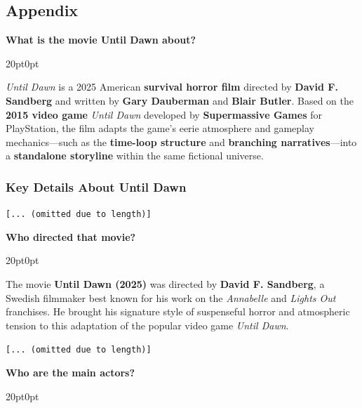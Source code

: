\documentclass[fleqn,moreauthors,10pt]{ds_report}
\begin{document}
\newpage
\begin{appendix}

\section*{Appendix}
\label{qwenconvo}

\begin{tcolorbox}[breakable,float*,width=\textwidth,title=Conversation Example with Advanced Qwen]


\textbf{What is the movie Until Dawn about?}

\begin{adjustwidth}{20pt}{0pt}

\emph{Until Dawn} is a 2025 American \textbf{survival horror film}
directed by \textbf{David F. Sandberg} and written by \textbf{Gary
Dauberman} and \textbf{Blair Butler}. Based on the \textbf{2015 video
game} \emph{Until Dawn} developed by \textbf{Supermassive Games} for
PlayStation, the film adapts the game's eerie atmosphere and gameplay
mechanics---such as the \textbf{time-loop structure} and
\textbf{branching narratives}---into a \textbf{standalone storyline}
within the same fictional universe.

\subsubsection*{Key Details About Until Dawn}

\texttt{[... (omitted due to length)]} \\

\end{adjustwidth}

\textbf{Who directed that movie?}

\begin{adjustwidth}{20pt}{0pt}

The movie \textbf{Until Dawn (2025)} was directed by \textbf{David F.
Sandberg}, a Swedish filmmaker best known for his work on the
\emph{Annabelle} and \emph{Lights Out} franchises. He brought his
signature style of suspenseful horror and atmospheric tension to this
adaptation of the popular video game \emph{Until Dawn}.

\texttt{[... (omitted due to length)]} \\

\end{adjustwidth}

\textbf{Who are the main actors?}

\begin{adjustwidth}{20pt}{0pt}


\end{adjustwidth}
\end{tcolorbox}
\end{appendix}
\end{document}
